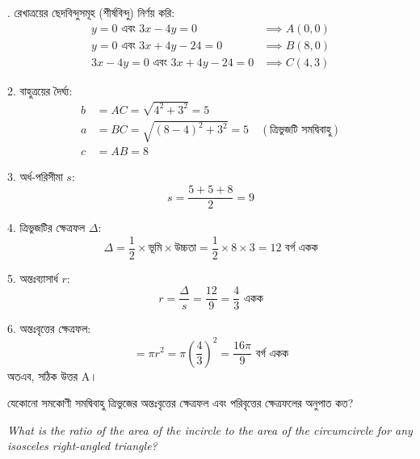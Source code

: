 \documentclass[12pt, a4paper]{article}
\begin{document}
\begin{tcolorbox}[solutionbox={সমাধান (Solution)}]
    . রেখাত্রয়ের ছেদবিন্দুসমূহ (শীর্ষবিন্দু) নির্ণয় করি:
    \begin{align*}
        y = 0 \text{ এবং } 3x - 4y = 0 &\implies A(0, 0) \\
        y = 0 \text{ এবং } 3x + 4y - 24 = 0 &\implies B(8, 0) \\
        3x - 4y = 0 \text{ এবং } 3x + 4y - 24 = 0 &\implies C(4, 3)
    \end{align*}
    
    2. বাহুত্রয়ের দৈর্ঘ্য:
    \begin{align*}
        b &= AC = \sqrt{4^2 + 3^2} = 5 \\
        a &= BC = \sqrt{(8-4)^2 + 3^2} = 5 \quad (\text{ত্রিভুজটি সমদ্বিবাহু}) \\
        c &= AB = 8
    \end{align*}
    
    3. অর্ধ-পরিসীমা $s$:
    \[ s = \frac{5 + 5 + 8}{2} = 9 \]
    
    4. ত্রিভুজটির ক্ষেত্রফল $\Delta$:
    \[ \Delta = \frac{1}{2} \times \text{ভূমি} \times \text{উচ্চতা} = \frac{1}{2} \times 8 \times 3 = 12 \text{ বর্গ একক} \]
    
    5. অন্তঃব্যাসার্ধ $r$:
    \[ r = \frac{\Delta}{s} = \frac{12}{9} = \frac{4}{3} \text{ একক} \]
    
    6. অন্তঃবৃত্তের ক্ষেত্রফল:
    \[ = \pi r^2 = \pi \left(\frac{4}{3}\right)^2 = \frac{16\pi}{9} \text{ বর্গ একক} \]
    অতএব, সঠিক উত্তর A।
\end{tcolorbox}

\begin{tcolorbox}[questionbox={প্রশ্ন (Question) 41}]
    \noindent
    যেকোনো সমকোণী সমদ্বিবাহু ত্রিভুজের অন্তঃবৃত্তের ক্ষেত্রফল এবং পরিবৃত্তের ক্ষেত্রফলের অনুপাত কত?
    
    \vspace{0.8em}
    \begin{english}
    \noindent\textit{\color{darkgray}
    What is the ratio of the area of the incircle to the area of the circumcircle for any isosceles right-angled triangle?
    }
    \end{english}
\end{tcolorbox}
\end{document}
